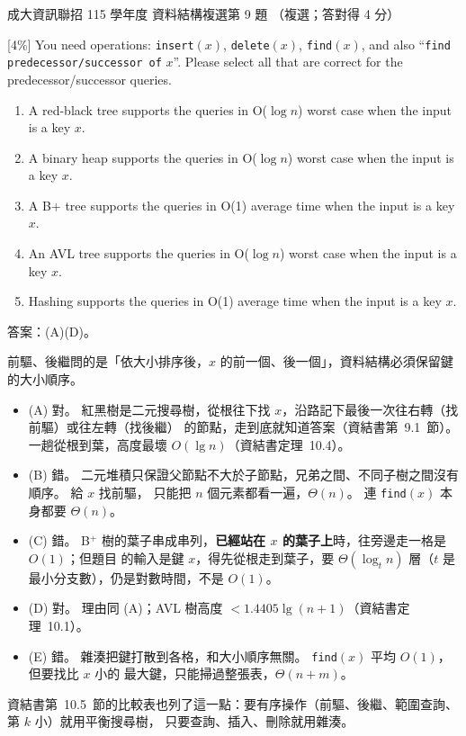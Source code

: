 \begin{pastexam}[label={px:ncku-115-prog-06}]{成大資訊聯招 115 學年度 資料結構複選第 9 題}
（複選；答對得 4 分）

[4\%] You need operations: \texttt{insert}$(x)$, \texttt{delete}$(x)$, \texttt{find}$(x)$, and also
``\texttt{find predecessor/successor of} $x$''. Please select all that are correct for the
predecessor/successor queries.
\begin{enumerate}[label=(\Alph*),nosep]
\item A red-black tree supports the queries in O($\log n$) worst case when the input is a key $x$.
\item A binary heap supports the queries in O($\log n$) worst case when the input is a key $x$.
\item A B+ tree supports the queries in O(1) average time when the input is a key $x$.
\item An AVL tree supports the queries in O($\log n$) worst case when the input is a key $x$.
\item Hashing supports the queries in O(1) average time when the input is a key $x$.
\end{enumerate}
\end{pastexam}

\begin{pastsoln}
答案：(A)(D)。

前驅、後繼問的是「依大小排序後，$x$ 的前一個、後一個」，資料結構必須保留鍵的大小順序。
\begin{itemize}
\item (A) 對。 紅黑樹是二元搜尋樹，從根往下找 $x$，沿路記下最後一次往右轉（找前驅）或往左轉（找後繼）
的節點，走到底就知道答案（資結書第~9.1~節）。 一趟從根到葉，高度最壞 $O(\lg n)$（資結書定理~10.4）。
\item (B) 錯。 二元堆積只保證父節點不大於子節點，兄弟之間、不同子樹之間沒有順序。 給 $x$ 找前驅，
只能把 $n$ 個元素都看一遍，$\Theta(n)$。 連 \texttt{find}$(x)$ 本身都要 $\Theta(n)$。
\item (C) 錯。 B$^+$ 樹的葉子串成串列，\textbf{已經站在 $x$ 的葉子上}時，往旁邊走一格是 $O(1)$；但題目
的輸入是鍵 $x$，得先從根走到葉子，要 $\Theta(\log_t n)$ 層（$t$ 是最小分支數），仍是對數時間，不是
$O(1)$。
\item (D) 對。 理由同 (A)；AVL 樹高度 $< 1.4405 \lg(n+1)$（資結書定理~10.1）。
\item (E) 錯。 雜湊把鍵打散到各格，和大小順序無關。 \texttt{find}$(x)$ 平均 $O(1)$，但要找比 $x$ 小的
最大鍵，只能掃過整張表，$\Theta(n + m)$。
\end{itemize}
資結書第~10.5~節的比較表也列了這一點：要有序操作（前驅、後繼、範圍查詢、第 $k$ 小）就用平衡搜尋樹，
只要查詢、插入、刪除就用雜湊。
\end{pastsoln}
